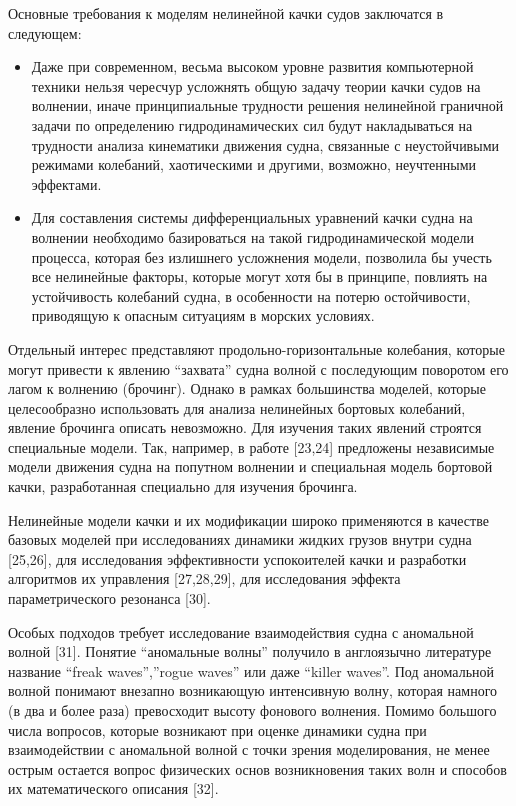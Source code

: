 Основные требования к моделям нелинейной качки судов заключатся в следующем: 
\begin{itemize}
	\item Даже при современном, весьма высоком уровне развития компьютерной техники нельзя чересчур усложнять общую задачу теории качки судов на волнении, иначе принципиальные трудности решения нелинейной граничной задачи по определению гидродинамических сил будут накладываться на трудности анализа кинематики движения судна, связанные с неустойчивыми режимами колебаний, хаотическими и другими, возможно, неучтенными эффектами.
	\item Для составления системы дифференциальных уравнений качки судна на волнении необходимо базироваться на такой гидродинамической модели процесса, которая без излишнего усложнения модели, позволила бы учесть все нелинейные факторы, которые могут хотя бы в принципе, повлиять на устойчивость колебаний судна, в особенности на потерю остойчивости, приводящую к опасным ситуациям в морских условиях.
\end{itemize}

Отдельный интерес представляют продольно-горизонтальные колебания, которые могут привести к явлению “захвата” судна волной с последующим поворотом его лагом к волнению (брочинг). Однако в рамках большинства моделей, которые целесообразно использовать для анализа нелинейных бортовых колебаний, явление брочинга описать невозможно. Для изучения таких явлений строятся специальные модели. Так, например, в работе [23,24] предложены независимые модели движения судна на попутном волнении и специальная модель бортовой качки, разработанная специально для изучения брочинга. 

Нелинейные модели качки и их модификации широко применяются в качестве базовых моделей при исследованиях динамики жидких грузов внутри судна [25,26], для исследования эффективности успокоителей качки и разработки алгоритмов их управления [27,28,29], для исследования эффекта параметрического резонанса [30].

Особых подходов требует исследование взаимодействия судна с аномальной волной [31]. Понятие “аномальные волны” получило в англоязычно литературе название “freak waves”,”rogue waves” или даже “killer waves”. Под аномальной волной понимают внезапно возникающую интенсивную волну, которая намного (в два и более раза) превосходит высоту фонового волнения. Помимо большого числа вопросов, которые возникают при оценке динамики судна при взаимодействии с аномальной волной с точки зрения моделирования, не менее острым остается вопрос физических основ возникновения таких волн и способов их математического описания [32].

